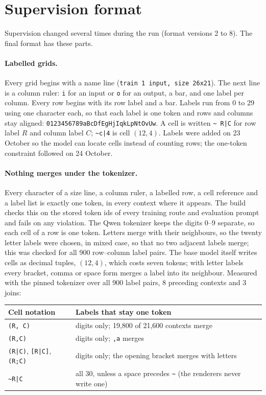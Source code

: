 \documentclass[11pt]{article}
\begin{document}
\section{Supervision format}
\label{app:supervision}

Supervision changed several times during the run (format versions 2 to 8). The
final format has these parts.

\paragraph{Labelled grids.} Every grid begins with a name line (\texttt{train 1
input, size 26x21}). The next line is a column ruler: \texttt{i} for an input or
\texttt{o} for an output, a bar, and one label per column. Every row begins with
its row label and a bar. Labels run from 0 to 29 using one character each, so
that each label is one token and rows and columns stay aligned:
\texttt{0123456789aBcDfEgHjIqkLpNtOvUw}. A cell is written \texttt{\textasciitilde
R|C} for row label $R$ and column label $C$; \texttt{\textasciitilde c|4} is
cell $(12,4)$. Labels were added on 23 October so the model can locate cells
instead of counting rows; the one-token constraint followed on 24 October.

\paragraph{Nothing merges under the tokenizer.} Every character of a size line,
a column ruler, a labelled row, a cell reference and a label list is exactly one
token, in every context where it appears. The build checks this on the stored
token ids of every training route and evaluation prompt and fails on any
violation. The Qwen tokenizer keeps the digits 0--9 separate, so each cell of a
row is one token. Letters merge with their neighbours, so the twenty letter
labels were chosen, in mixed case, so that no two adjacent labels merge; this
was checked for all 900 row--column label pairs. The base model itself writes
cells as decimal tuples, $(12, 4)$, which costs seven tokens; with letter labels
every bracket, comma or space form merges a label into its neighbour. Measured
with the pinned tokenizer over all 900 label pairs, 8 preceding contexts and 3
joins:

\begin{center}
\small
\begin{tabular}{ll}
\toprule
Cell notation & Labels that stay one token \\
\midrule
\texttt{(R, C)} & digits only; 19,800 of 21,600 contexts merge \\
\texttt{(R,C)} & digits only; \texttt{,a} merges \\
\texttt{(R|C)}, \texttt{[R|C]}, \texttt{(R;C)} & digits only; the opening bracket merges with letters \\
\texttt{\textasciitilde R|C} & all 30, unless a space precedes \texttt{\textasciitilde} (the renderers never write one) \\
\bottomrule
\end{tabular}
\end{center}
\end{document}
